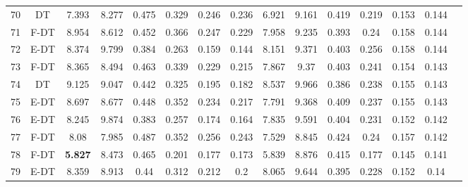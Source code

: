 \begin{longtable}{@{\hskip3pt}c@{\hskip3pt}c@{\hskip3pt}c@{\hskip3pt}c@{\hskip3pt}c@{\hskip3pt}c@{\hskip3pt}c@{\hskip3pt}c@{\hskip3pt}c@{\hskip3pt}c@{\hskip3pt}c@{\hskip3pt}c@{\hskip3pt}c@{\hskip3pt}c@{\hskip3pt}c}
         70 &             DT &             7.393 &       8.277 &           0.475 &           0.329 &           0.246 &           0.236 &               6.921 &       9.161 &           0.419 &         0.219 &          0.153 &           0.144 \\
         71 &           F-DT &             8.954 &       8.612 &           0.452 &           0.366 &           0.247 &           0.229 &               7.958 &       9.235 &           0.393 &          0.24 &          0.158 &           0.144 \\
         72 &           E-DT &             8.374 &       9.799 &           0.384 &           0.263 &           0.159 &           0.144 &               8.151 &       9.371 &           0.403 &         0.256 &          0.158 &           0.144 \\
         73 &           F-DT &             8.365 &       8.494 &           0.463 &           0.339 &           0.229 &           0.215 &               7.867 &        9.37 &           0.403 &         0.241 &          0.154 &           0.143 \\
         74 &             DT &             9.125 &       9.047 &           0.442 &           0.325 &           0.195 &           0.182 &               8.537 &       9.966 &           0.386 &         0.238 &          0.155 &           0.143 \\
         75 &           E-DT &             8.697 &       8.677 &           0.448 &           0.352 &           0.234 &           0.217 &               7.791 &       9.368 &           0.409 &         0.237 &          0.155 &           0.143 \\
         76 &           E-DT &             8.245 &       9.874 &           0.383 &           0.257 &           0.174 &           0.164 &               7.835 &       9.591 &           0.404 &         0.231 &          0.152 &           0.142 \\
         77 &           F-DT &              8.08 &       7.985 &           0.487 &           0.352 &           0.256 &           0.243 &               7.529 &       8.845 &           0.424 &          0.24 &          0.157 &           0.142 \\
         78 &           F-DT &    \textbf{5.827} &       8.473 &           0.465 &           0.201 &           0.177 &           0.173 &               5.839 &       8.876 &           0.415 &         0.177 &          0.145 &           0.141 \\
         79 &           E-DT &             8.359 &       8.913 &            0.44 &           0.312 &           0.212 &             0.2 &               8.065 &       9.644 &           0.395 &         0.228 &          0.152 &            0.14 \\

\end{longtable}
